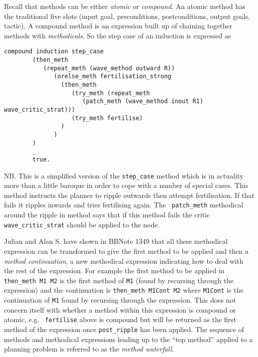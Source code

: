 Recall that methods can be either {\em atomic} or {\em compound}.  An
atomic method has the traditional five slots
(input goal,
preconditions,
postconditions, output goals, tactic).  A compound
method is an expression built up of chaining
together methods with 
{\em methodicals}.  So the step case of an induction is expressed as 
\begin{verbatim}
compound induction step_case  
        (then_meth
           (repeat_meth (wave_method outward R))
              (orelse_meth fertilisation_strong
                (then_meth      
                   (try_meth (repeat_meth 
                      (patch_meth (wave_method inout R1) wave_critic_strat)))
                   (try_meth fertilise)
                )
              )
        )
        _
        true.
\end{verbatim}
NB.  This is a simplified version of the {\tt step\_case} method which
is in actuality more than a little baroque in order to cope with a
number of special cases.  This method instructs the planner to ripple
outwards then attempt
fertilisation.  If that fails it ripples
inwards and tries fertilising again.  The {\tt
  patch\_meth} methodical around
the ripple in method says that if this method fails the critic {\tt
  wave\_critic\_strat} should be applied to
the node.

Julian and Alan S. have shown in BBNote 1349 that all these methodical 
expression can be transformed to give the first method to be
applied and then a {\em method continuation}, a new methodical
expression indicating how to deal with the rest of the expression.
For example the first method to be applied in {\tt then\_meth M1 M2}
is the first method of {\tt M1} (found by recursing through the
expression) and the continuation is {\tt then\_meth M1Cont M2} where
{\tt M1Cont} is the continuation of {\tt M1} found by recursing
through the expression.  This does not concern itself with whether a
method within this expression is compound or atomic, e.g. {\tt
  fertilise} above is compound but will be returned
as the first method  
of the expression once {\tt post\_ripple} has been
applied.    The 
sequence of methods and methodical expressions  
leading up to the ``top method'' applied to a planning problem is
referred to as the {\em method waterfall}. 

